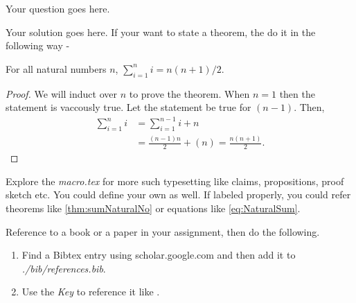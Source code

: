 \documentclass[12pt]{article}
\begin{document}
    \noindent
    
    \onehalfspace

    \begin{question}
        Your question goes here. 
    \end{question}

    \begin{solution}
        Your solution goes here. If your want to state a theorem, the do it in the following way - 
        \begin{theorem} \label{thm:sumNaturalNo}
            For all natural numbers $n$, $\sum_{i=1}^n i = n(n+1)/2$.
        \end{theorem}
        \begin{proof}
            We will induct over $n$ to prove the theorem. When $n=1$ then the statement is vaccously true. Let the statement be true for $(n-1)$. Then,
            \begin{align}
                \sum_{i=1}^{n} i &= \sum_{i=1}^{n-1} i + n \\
                &= \frac{(n-1)n}{2} + (n) = \frac{n(n+1)}{2}. \label{eq:NaturalSum}
            \end{align}
        \end{proof}
        
        Explore the \emph{macro.tex} for more such typesetting like claims, propositions, proof sketch etc. You could define your own as well. If labeled properly, you could refer theorems like \autoref{thm:sumNaturalNo} or equations like \autoref{eq:NaturalSum}. 

        \noindent Reference to a book or a paper in your assignment, then do the following.
        \begin{enumerate}
            \item Find a Bibtex entry using scholar.google.com and then add it to \emph{./bib/references.bib}.
            \item Use the \emph{Key} to reference it like \cite{RK12}.
        \end{enumerate}
    \end{solution}

    
    
\end{document}
